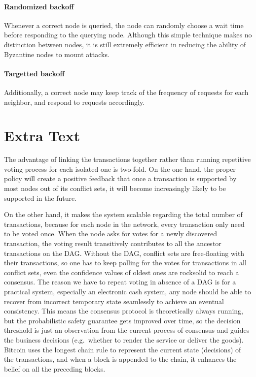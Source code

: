 \paragraph{Randomized backoff} Whenever a correct node is queried, the node can randomly choose a wait time before responding to the querying node. Although this simple technique makes no distinction between nodes, it is still extremely efficient in reducing the ability of Byzantine nodes to mount attacks. 
\paragraph{Targetted backoff} Additionally, a correct node may keep track of the frequency of requests for each neighbor, and respond to requests accordingly. 


\section{Extra Text}

The advantage of linking the transactions together rather than running
repetitive voting process for each isolated one is two-fold. On the one hand,
the proper policy will create a positive feedback that once a transaction is
supported by most nodes out of its conflict sets, it will become increasingly
likely to be supported in the future.

On the other hand, it makes the system scalable regarding the total number of
transactions, because for each node in the network, every transaction only need
to be voted once.  When the node asks for votes for a newly discovered
transaction, the voting result transitively contributes to all the ancestor
transactions on the DAG\@.  Without the DAG, conflict sets are free-floating with
their transactions, so one has to keep polling for the votes for transactions
in all conflict sets, even the confidence values of oldest ones are rocksolid to
reach a consensus. The reason we have to repeat voting in absence of a DAG is
for a practical system, especially an electronic cash system, any node
should be able to recover from incorrect temporary state seamlessly
to achieve an eventual consistency. This means the consensus protocol is
theoretically always running, but the probabilistic safety guarantee gets
improved over time, so the decision threshold is just an observation from the
current process of consensus and guides the business decisions (e.g.\ whether
to render the service or deliver the goods).  Bitcoin uses the longest chain
rule to represent the current state (decisions) of the transactions, and when a
block is appended to the chain, it enhances the belief on all the preceding
blocks.


